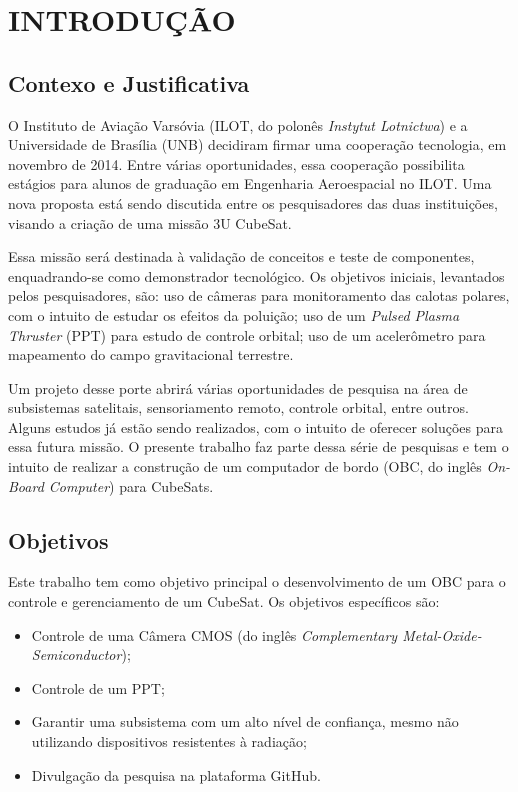 
\chapter[INTRODUÇÃO]{INTRODUÇÃO}
\section{Contexo e Justificativa}

O Instituto de Aviação Varsóvia (ILOT, do polonês \textit{Instytut Lotnictwa}) e a Universidade de Brasília (UNB) decidiram firmar uma cooperação tecnologia, em novembro de 2014. Entre várias oportunidades, essa cooperação possibilita estágios para alunos de graduação em Engenharia Aeroespacial no ILOT. Uma nova proposta está sendo discutida entre os pesquisadores das duas instituições, visando a criação de uma missão 3U CubeSat.

Essa missão será destinada à validação de conceitos e teste de componentes, enquadrando-se como demonstrador tecnológico. Os objetivos iniciais, levantados pelos pesquisadores, são: uso de câmeras para monitoramento das calotas polares, com o intuito de estudar os efeitos da poluição; uso de um \textit{Pulsed Plasma Thruster} (PPT) para estudo de controle orbital;  uso de um acelerômetro para mapeamento do campo gravitacional terrestre.

Um projeto desse porte abrirá várias oportunidades de pesquisa na área de subsistemas satelitais, sensoriamento remoto, controle orbital, entre outros. Alguns estudos já estão sendo realizados, com o intuito de oferecer soluções para essa futura missão. O presente trabalho faz parte dessa série de pesquisas e tem o intuito de realizar a construção de um computador de bordo (OBC, do inglês \textit{On-Board Computer}) para CubeSats.



\section{Objetivos}

Este trabalho tem como objetivo principal o desenvolvimento de um OBC para o controle e gerenciamento de um CubeSat.  Os objetivos específicos são:

\begin{itemize}

	\item Controle de uma Câmera CMOS (do inglês \textit{Complementary Metal-Oxide-Semiconductor});
	\item Controle de um PPT;
	\item Garantir uma subsistema com um alto nível de confiança, mesmo não utilizando dispositivos resistentes à radiação;
	\item Divulgação da pesquisa na plataforma GitHub.

\end{itemize}



